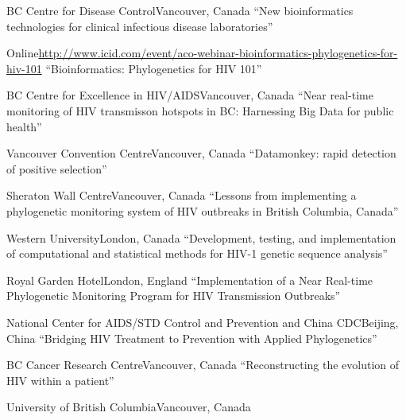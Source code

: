 \documentclass[11pt]{moderncv}
\begin{document}
{BC Centre for Disease Control}{Vancouver, Canada}
{``New bioinformatics technologies for clinical infectious disease laboratories''}

{Online}{\url{http://www.icid.com/event/aco-webinar-bioinformatics-phylogenetics-for-hiv-101}}
{``Bioinformatics: Phylogenetics for HIV 101''}

{BC Centre for Excellence in HIV/AIDS}{Vancouver, Canada}
{``Near real-time monitoring of HIV transmisson hotspots in BC: Harnessing Big Data for public health''}

{Vancouver Convention Centre}{Vancouver, Canada}
{``Datamonkey: rapid detection of positive selection''}

{Sheraton Wall Centre}{Vancouver, Canada}
{``Lessons from implementing a phylogenetic monitoring system of HIV outbreaks in British Columbia, Canada''}

{Western University}{London, Canada}
{``Development, testing, and implementation of computational and statistical methods for HIV-1 genetic sequence analysis''}

{Royal Garden Hotel}{London, England}
{``Implementation of a Near Real-time Phylogenetic Monitoring Program for HIV Transmission Outbreaks''}

{National Center for AIDS/STD Control and Prevention and China CDC}{Beijing, China}
{``Bridging HIV Treatment to Prevention with Applied Phylogenetics''}

{BC Cancer Research Centre}{Vancouver, Canada}
{``Reconstructing the evolution of HIV within a patient''}

{University of British Columbia}{Vancouver, Canada}
{}
\end{document}
